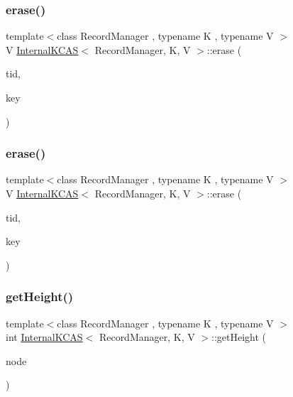 \mbox{\label{classInternalKCAS_a13be8756f4bed1d759d5018aa0d2d380}} 
\subsubsection{\texorpdfstring{erase()}{erase()}\hspace{0.1cm}{\footnotesize\ttfamily [1/2]}}
{\footnotesize\ttfamily template$<$class Record\+Manager , typename K , typename V $>$ \\
V \hyperlink{classInternalKCAS}{Internal\+K\+C\+AS}$<$ Record\+Manager, K, V $>$\+::erase (\begin{DoxyParamCaption}\item[{const int}]{tid,  }\item[{const K \&}]{key }\end{DoxyParamCaption})}

\mbox{\label{classInternalKCAS_a13be8756f4bed1d759d5018aa0d2d380}} 
\subsubsection{\texorpdfstring{erase()}{erase()}\hspace{0.1cm}{\footnotesize\ttfamily [2/2]}}
{\footnotesize\ttfamily template$<$class Record\+Manager , typename K , typename V $>$ \\
V \hyperlink{classInternalKCAS}{Internal\+K\+C\+AS}$<$ Record\+Manager, K, V $>$\+::erase (\begin{DoxyParamCaption}\item[{const int}]{tid,  }\item[{const K \&}]{key }\end{DoxyParamCaption})\hspace{0.3cm}{\ttfamily [inline]}}

\mbox{\label{classInternalKCAS_ad72d4be132cc659a5c992321277cf193}} 
\subsubsection{\texorpdfstring{get\+Height()}{getHeight()}}
{\footnotesize\ttfamily template$<$class Record\+Manager , typename K , typename V $>$ \\
int \hyperlink{classInternalKCAS}{Internal\+K\+C\+AS}$<$ Record\+Manager, K, V $>$\+::get\+Height (\begin{DoxyParamCaption}\item[{\hyperlink{classNode}{Node}$<$ K, V $>$ $\ast$}]{node }\end{DoxyParamCaption})}

